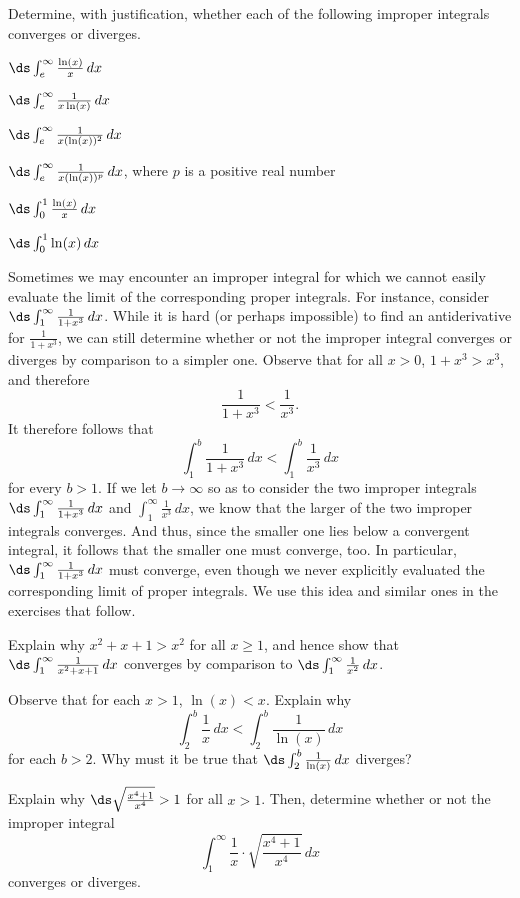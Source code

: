 \begin{exercises} 
  \item Determine, with justification, whether each of the following improper integrals converges or diverges.
  \ba
  	\item $\ds \int_e^{\infty} \frac{\ln(x)}{x} \, dx$
  	\item $\ds \int_e^{\infty} \frac{1}{x\ln(x)} \, dx$
  	\item $\ds \int_e^{\infty} \frac{1}{x(\ln(x))^2} \, dx$	
  	\item $\ds \int_e^{\infty} \frac{1}{x(\ln(x))^p} \, dx$, where $p$ is a positive real number	
	\item $\ds \int_0^1 \frac{\ln(x)}{x} \, dx$
	\item $\ds \int_0^1 \ln(x) \, dx$
  \ea
  
  \item Sometimes we may encounter an improper integral for which we cannot easily evaluate the limit of the corresponding proper integrals.  For instance, consider $\ds \int_1^{\infty} \frac{1}{1+x^3} \, dx$.  While it is hard (or perhaps impossible) to find an antiderivative for $\frac{1}{1+x^3}$, we can still determine whether or not the improper integral converges or diverges by comparison to a simpler one.  Observe that for all $x > 0$, $1 + x^3 > x^3$, and therefore
  $$\frac{1}{1+x^3} < \frac{1}{x^3}.$$
  It therefore follows that 
  $$\int_1^b \frac{1}{1+x^3} \, dx < \int_1^b \frac{1}{x^3} \, dx$$
  for every $b > 1$.  If we let $b \to \infty$ so as to consider the two improper integrals $\ds \int_1^\infty \frac{1}{1+x^3} \, dx$ and $\int_1^\infty \frac{1}{x^3} \, dx$, we know that the larger of the two improper integrals converges.  And thus, since the smaller one lies below a convergent integral, it follows that the smaller one must converge, too.  In particular, $\ds \int_1^\infty \frac{1}{1+x^3} \, dx$ must converge, even though we never explicitly evaluated the corresponding limit of proper integrals.  We use this idea and similar ones in the exercises that follow.
  
  \ba
  	\item Explain why $x^2 + x + 1 > x^2$ for all $x \ge 1$, and hence show that $\ds \int_1^{\infty} \frac{1}{x^2 + x + 1} \, dx$ converges by comparison to $\ds \int_1^{\infty} \frac{1}{x^2} \, dx$.
	\item Observe that for each $x > 1$, $\ln(x) < x$.  Explain why
	$$\int_2^b \frac{1}{x} \, dx < \int_2^b \frac{1}{\ln(x)} \,dx$$
	for each $b > 2$.	Why must it be true that $\ds \int_2^b \frac{1}{\ln(x)} \, dx$ diverges?
	\item Explain why $\ds \sqrt{\frac{x^4+1}{x^4}} > 1$ for all $x > 1$.  Then, determine whether or not the improper integral
	$$\int_1^{\infty} \frac{1}{x} \cdot \sqrt{\frac{x^4+1}{x^4}} \, dx$$
	converges or diverges.
  \ea
  
\end{exercises}
\afterexercises
